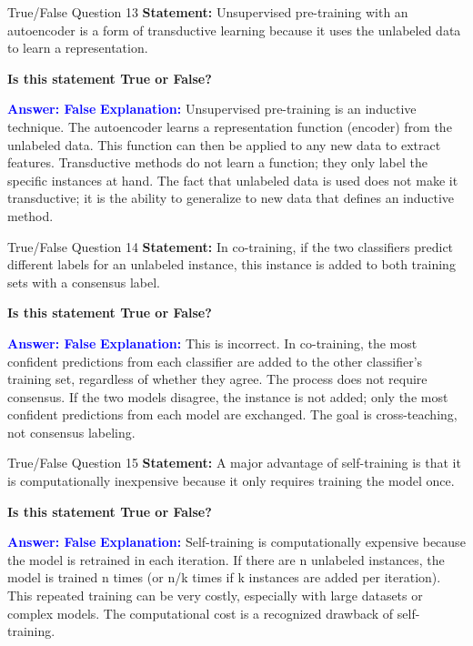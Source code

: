 \documentclass[8pt]{beamer}  %
\begin{document}
	\begin{frame}{True/False Question 13}
		\textbf{Statement:} Unsupervised pre-training with an autoencoder is a form of transductive learning because it uses the unlabeled data to learn a representation.
		
		\vspace{0.3cm}
		\textbf{Is this statement True or False?}
		
		\vspace{0.2cm}
		\textcolor{blue}{\textbf{Answer: False}}
		\vspace{0.2cm}
		\textcolor{blue}{\textbf{Explanation:}} Unsupervised pre-training is an inductive technique. The autoencoder learns a representation function (encoder) from the unlabeled data. This function can then be applied to any new data to extract features. Transductive methods do not learn a function; they only label the specific instances at hand. The fact that unlabeled data is used does not make it transductive; it is the ability to generalize to new data that defines an inductive method.
	\end{frame}
	
	\begin{frame}{True/False Question 14}
		\textbf{Statement:} In co-training, if the two classifiers predict different labels for an unlabeled instance, this instance is added to both training sets with a consensus label.
		
		\vspace{0.3cm}
		\textbf{Is this statement True or False?}
		
		\vspace{0.2cm}
		\textcolor{blue}{\textbf{Answer: False}}
		\vspace{0.2cm}
		\textcolor{blue}{\textbf{Explanation:}} This is incorrect. In co-training, the most confident predictions from each classifier are added to the other classifier's training set, regardless of whether they agree. The process does not require consensus. If the two models disagree, the instance is not added; only the most confident predictions from each model are exchanged. The goal is cross-teaching, not consensus labeling.
	\end{frame}
	
	\begin{frame}{True/False Question 15}
		\textbf{Statement:} A major advantage of self-training is that it is computationally inexpensive because it only requires training the model once.
		
		\vspace{0.3cm}
		\textbf{Is this statement True or False?}
		
		\vspace{0.2cm}
		\textcolor{blue}{\textbf{Answer: False}}
		\vspace{0.2cm}
		\textcolor{blue}{\textbf{Explanation:}} Self-training is computationally expensive because the model is retrained in each iteration. If there are n unlabeled instances, the model is trained n times (or n/k times if k instances are added per iteration). This repeated training can be very costly, especially with large datasets or complex models. The computational cost is a recognized drawback of self-training.
	\end{frame}
	
\end{document}
